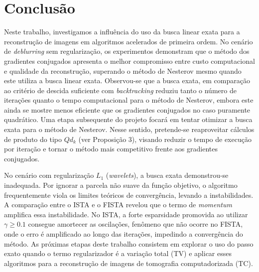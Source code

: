 \documentclass[12pt]{article}
\newcommand{\norm}[1]{\left\lVert#1\right\rVert}
\begin{document}




\section{Conclusão}
Neste trabalho, investigamos a influência do uso da busca linear exata para a reconstrução de imagens em algoritmos acelerados de primeira ordem. No cenário de \textit{deblurring} sem regularização, os experimentos demonstram que o método dos gradientes conjugados apresenta o melhor compromisso entre custo computacional e qualidade da reconstrução, superando o método de Nesterov mesmo quando este utiliza a busca linear exata. Observou-se que a busca exata, em comparação ao critério de descida suficiente com \textit{backtracking} reduziu tanto o número de iterações quanto o tempo computacional para o método de Nesterov, embora este ainda se mostre menos eficiente que os gradientes conjugados no caso puramente quadrático. 
Uma etapa subsequente do projeto focará em tentar otimizar a busca exata para o método de Nesterov. Nesse sentido, pretende-se reaproveitar cálculos de produto do tipo $Qd_k$ (ver Proposição 3), visando reduzir o tempo de execução por iteração e tornar o método mais competitivo frente aos gradientes conjugados.

No cenário com regularização $L_1$ (\textit{wavelets}), a busca exata demonstrou-se inadequada. Por ignorar a parcela não suave da função objetivo, o algoritmo frequentemente viola os limites teóricos de convergência, levando a instabilidades. A comparação entre o ISTA e o FISTA revelou que o termo de \textit{momentum} amplifica essa instabilidade. No ISTA, a forte esparsidade promovida ao utilizar $\gamma \geq 0.1$ consegue amortecer as oscilações, fenômeno que não ocorre no FISTA, onde o erro é amplificado ao longo das iterações, impedindo a convergência do método.
As próximas etapas deste trabalho consistem em explorar o uso do passo exato quando o termo regularizador é a variação total (TV) e aplicar esses algoritmos para a reconstrução de imagens de tomografia computadorizada (TC). 


\printbibliography
\nocite{*}
\end{document}
